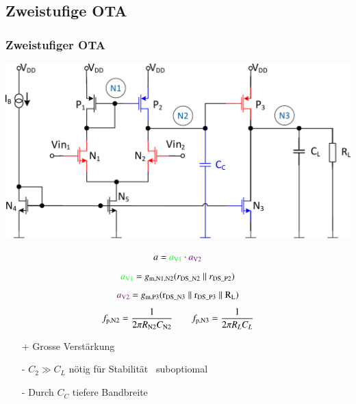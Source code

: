 \subsection{Zweistufige OTA}

\subsubsection{Zweistufiger OTA}

\begin{minipage}[t]{0.5\columnwidth}
    \includegraphics[width=\columnwidth, align=t]{images/11_OTA_zweistufig.pdf}
\end{minipage}
\hfill
\begin{minipage}[t]{0.48\columnwidth}
    \[
        a = {\color{green}a_{\rm V1}} \cdot {\color{violet}a_{\rm V2}} 
    \]
    \[
        {\color{green}a_{\rm V1}} = g_{\rm m, N1, N2} (r_{\rm DS\_N2} \parallel r_{\rm DS\_P2})
    \]
    \[
        {\color{violet}a_{\rm V2}} = g_{\rm m, P3} (\rm r_{DS\_N3} \parallel r_{\rm DS\_P3} \parallel R_L)
    \]
    \[
        f_{\rm p,N2} = \frac{1}{2\pi R_{\rm N2} C_{\rm N2}} \qquad f_{\rm p,N3} = \frac{1}{2\pi R_{L} C_{L}}
    \]
\end{minipage}

\smallskip

\begin{minipage}[t]{0.35\columnwidth}
    \begin{itemize}
        \item[+] Grosse Verstärkung
    \end{itemize}
\end{minipage}
\hfill
\begin{minipage}[t]{0.63\columnwidth}
    \begin{itemize}
        \item[-] $C_2 \gg C_L$ nötig für Stabilität \textrightarrow\ suboptiomal
        \item[-] Durch $C_C$ tiefere Bandbreite
    \end{itemize}
\end{minipage}



